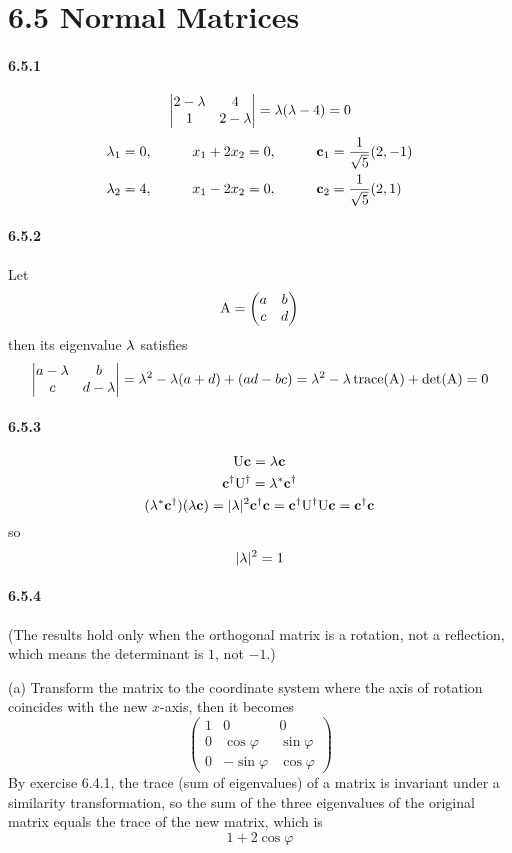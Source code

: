 \documentclass[a4paper]{article}
\begin{document}
\section*{6.5 Normal Matrices}

\paragraph{6.5.1}
\[
\begin{vmatrix}
 2-\lambda&4 \\
 1 & 2-\lambda 
\end{vmatrix}=
\lambda(\lambda-4)=0
\]
\begin{alignat*}{3}
    & \lambda_1=0 ,\qquad && x_1+2x_2=0,\qquad && \mathbf{c}_1=\frac{1}{\sqrt{5}}(2,-1) \\
    & \lambda_2=4 ,\qquad && x_1-2x_2=0,\qquad && \mathbf{c}_2=\frac{1}{\sqrt{5}}(2,1)\\
\end{alignat*}

\paragraph{6.5.2}
\renewcommand{\arraystretch}{1.0}
Let 
\[
\mathrm{A}=\begin{pmatrix}
a&b\\c&d
\end{pmatrix}
\]
then its eigenvalue $\lambda$ satisfies
\[
\begin{vmatrix}
a-\lambda&b\\c&d-\lambda
\end{vmatrix}=\lambda^2-\lambda(a+d)+(ad-bc)=\lambda^2-\lambda\,\mathrm{trace}(\mathrm{A})+\det(\mathrm{A})=0
\]

\paragraph{6.5.3}
\[
\mathrm{U}\mathbf{c}=\lambda\mathbf{c}
\]
\[
\mathbf{c}^\dagger\mathrm{U}^\dagger=\lambda^*\mathbf{c}^\dagger
\]
\[
(\lambda^*\mathbf{c}^\dagger)(\lambda\mathbf{c})=|\lambda|^2\mathbf{c}^\dagger\mathbf{c}=\mathbf{c}^\dagger\mathrm{U}^\dagger\mathrm{U}\mathbf{c}=\mathbf{c}^\dagger\mathbf{c}
\]
so 
\[|\lambda|^2=1\]

\paragraph{6.5.4}
(The results hold only when the orthogonal matrix is a rotation, not a reflection, which means the determinant is $1$, not $-1$.)

(a)
Transform the matrix to the coordinate system where the axis of rotation coincides with the new $x$-axis, then it becomes
\[
\begin{pmatrix}
1&0&0\\
0&\cos\varphi&\sin\varphi\\
0&-\sin\varphi&\cos\varphi
\end{pmatrix}
\]
By exercise 6.4.1, the trace (sum of eigenvalues) of a matrix is invariant under a similarity transformation, so the sum of the three eigenvalues of the original matrix equals the trace of the new matrix, which is 
\[
1+2\cos\varphi
\]
\end{document}
